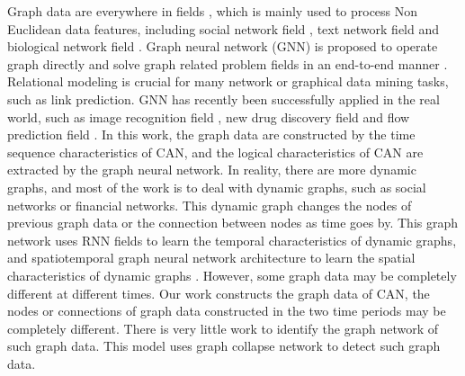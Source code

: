 \documentclass[lettersize,journal]{IEEEtran}
\begin{document}
Graph data are everywhere in fields \cite{7,8}, which is mainly used to process Non Euclidean data features, including social network field \cite{9}, text network field \cite{10} and biological network field \cite{11}. Graph neural network (GNN) is proposed to operate graph directly and solve graph related problem fields in an end-to-end manner \cite{12}. Relational modeling is crucial for many network or graphical data mining tasks, such as link prediction. GNN has recently been successfully applied in the real world, such as image recognition field \cite{13}, new drug discovery field \cite{14} and flow prediction field \cite{15}. In this work, the graph data are constructed by the time sequence characteristics of CAN, and the logical characteristics of CAN are extracted by the graph neural network. In reality, there are more dynamic graphs, and most of the work is to deal with dynamic graphs, such as social networks or financial networks. This dynamic graph changes the nodes of previous graph data or the connection between nodes as time goes by. This graph network uses RNN fields \cite{16,17} to learn the temporal characteristics of dynamic graphs, and spatiotemporal graph neural network architecture to learn the spatial characteristics of dynamic graphs \cite{18}. However, some graph data may be completely different at different times. Our work constructs the graph data of CAN, the nodes or connections of graph data constructed in the two time periods may be completely different. There is very little work to identify the graph network of such graph data. This model uses graph collapse network \cite{19} to detect such graph data.
\end{document}
